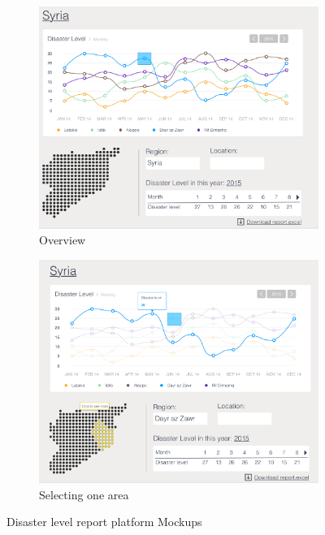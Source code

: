 \begin{figure}[H]
    \centering
    \begin{subfigure}[b]{0.45\textwidth}
        \centering
        \includegraphics[width=\textwidth]{figures/function-stakeholder-1}
        \caption{Overview}
        \label{fig:stakeholder1}
    \end{subfigure}
    \hfill
    \begin{subfigure}[b]{0.45\textwidth}
        \centering
        \includegraphics[width=\textwidth]{figures/function-stakeholder-2}
        \caption{Selecting one area}
        \label{fig:stakeholder2}
    \end{subfigure}
    \caption{Disaster level report platform Mockups}
\end{figure}

